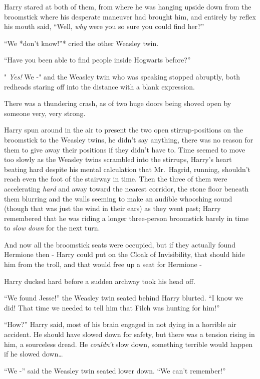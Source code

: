 Harry stared at both of them, from where he was hanging upside down from
the broomstick where his desperate maneuver had brought him, and
entirely by reflex his mouth said, ``Well, \emph{why} were you so sure
you could find her?''

``We *don't know!''* cried the other Weasley twin.

``Have you been able to find people inside Hogwarts before?''

" \emph{Yes!} We -" and the Weasley twin who was speaking stopped
abruptly, both redheads staring off into the distance with a blank
expression.

There was a thundering crash, as of two huge doors being shoved open by
someone very, very strong.

Harry spun around in the air to present the two open stirrup-positions
on the broomstick to the Weasley twins, he didn't say anything, there
was no reason for them to give away their positions if they didn't have
to. Time seemed to move too slowly as the Weasley twins scrambled into
the stirrups, Harry's heart beating hard despite his mental calculation
that Mr.~Hagrid, running, shouldn't reach even the foot of the stairway
in time. Then the three of them were accelerating \emph{hard} and away
toward the nearest corridor, the stone floor beneath them blurring and
the walls seeming to make an audible whooshing sound (though that was
just the wind in their ears) as they went past; Harry remembered that he
was riding a longer three-person broomstick barely in time to \emph{slow
down} for the next turn.

And now all the broomstick seats were occupied, but if they actually
found Hermione then - Harry could put on the Cloak of Invisibility, that
should hide him from the troll, and that would free up a seat for
Hermione -

Harry ducked hard before a sudden archway took his head off.

``We found Jesse!'' the Weasley twin seated behind Harry blurted. ``I
know we did! That time we needed to tell him that Filch was hunting for
him!''

``How?'' Harry said, most of his brain engaged in not dying in a
horrible air accident. He should have slowed down for safety, but there
was a tension rising in him, a sourceless dread. He \emph{couldn't} slow
down, something terrible would happen if he slowed down\ldots{}

``We -'' said the Weasley twin seated lower down. ``We can't remember!''

